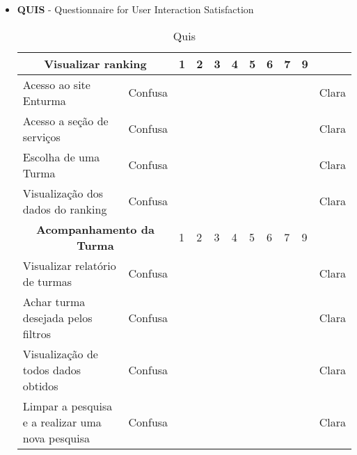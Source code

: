 \begin{itemize}
	\item \textbf{QUIS} - Questionnaire for User Interaction Satisfaction
		\begin{table}[H]
			\centering
			\caption{Quis}
			\label{my-label}
			\begin{tabular}{|l|l|l|l|l|l|l|l|l|l|l|}
			\hline
			\multicolumn{2}{|c|}{\textbf{Visualizar ranking}}                                                                                         & 1 & 2 & 3 & 4 & 5 & 6 & 7 & 9 &      \\ \hline Acesso ao site Enturma                                                                                                          & Confusa &   &   &   &   &   &   &   &   & Clara \\ \hline
			Acesso a seção de serviços                                                                                                      & Confusa &   &   &   &   &   &   &   &   & Clara \\ \hline
			Escolha de uma Turma                                                                                                            & Confusa &   &   &   &   &   &   &   &   & Clara \\ \hline
			Visualização dos dados do ranking                                                                                               & Confusa &   &   &   &   &   &   &   &   & Clara \\ \hline
			\multicolumn{2}{|c|}{\textbf{Acompanhamento da Turma}}                                                                                         & 1 & 2 & 3 & 4 & 5 & 6 & 7 & 9 &      \\ \hline
			Visualizar relatório de turmas                                                                                                  & Confusa &   &   &   &   &   &   &   &   & Clara \\ \hline
			Achar turma desejada pelos filtros                                                                                              & Confusa &   &   &   &   &   &   &   &   & Clara \\ \hline
			Visualização de todos dados obtidos                                                                                             & Confusa &   &   &   &   &   &   &   &   & Clara \\ \hline
			Limpar a pesquisa e a realizar uma nova pesquisa                                                                                & Confusa &   &   &   &   &   &   &   &   & Clara \\ \hline

\end{tabular}
\end{table}
\end{itemize}
